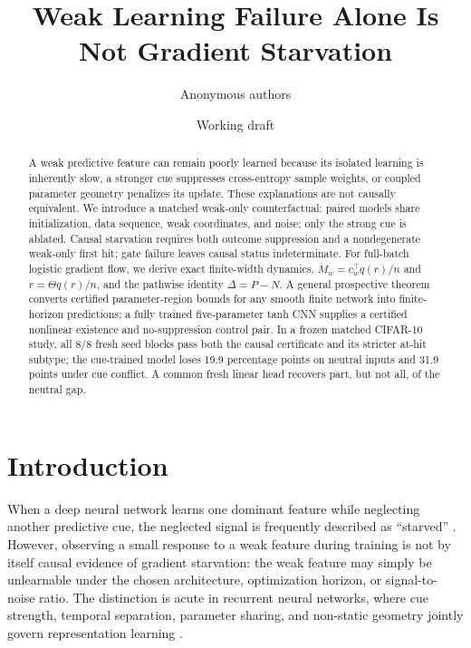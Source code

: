 \documentclass{article}
\title{Weak Learning Failure Alone Is Not Gradient Starvation}
\author{}
\author{Anonymous authors}
\date{Working draft}
\theoremstyle{definition}
\theoremstyle{remark}
\begin{document}
\maketitle

\begin{abstract}
A weak predictive feature can remain poorly learned because its isolated learning is inherently slow, a stronger cue suppresses cross-entropy sample weights, or coupled parameter geometry penalizes its update. These explanations are not causally equivalent. We introduce a matched weak-only counterfactual: paired models share initialization, data sequence, weak coordinates, and noise; only the strong cue is ablated. Causal starvation requires both outcome suppression and a nondegenerate weak-only first hit; gate failure leaves causal status indeterminate. For full-batch logistic gradient flow, we derive exact finite-width dynamics, $\dot M_w=c_w^\top q(r)/n$ and $\dot r=\Theta q(r)/n$, and the pathwise identity $\Delta=P-N$. A general prospective theorem converts certified parameter-region bounds for any smooth finite network into finite-horizon predictions; a fully trained five-parameter tanh CNN supplies a certified nonlinear existence and no-suppression control pair. In a frozen matched CIFAR-10 study, all 8/8 fresh seed blocks pass both the causal certificate and its stricter at-hit subtype; the cue-trained model loses 19.9 percentage points on neutral inputs and 31.9 points under cue conflict. A common fresh linear head recovers part, but not all, of the neutral gap.
\end{abstract}

\section{Introduction}
When a deep neural network learns one dominant feature while neglecting another predictive cue, the neglected signal is frequently described as ``starved'' \citep{pezeshki2021gradient}. However, observing a small response to a weak feature during training is not by itself causal evidence of gradient starvation: the weak feature may simply be unlearnable under the chosen architecture, optimization horizon, or signal-to-noise ratio. The distinction is acute in recurrent neural networks, where cue strength, temporal separation, parameter sharing, and non-static geometry jointly govern representation learning \citep{bengio1994learning,hochreiter1997lstm,cho2014gru}.
\end{document}
